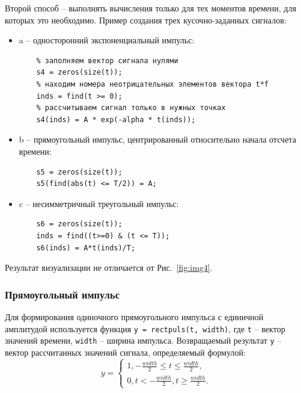 \documentclass[12pt,a4paper]{article}
\begin{document}
Второй способ -- выполнять вычисления только для тех моментов времени, для которых это необходимо. Пример создания  трех кусочно-заданных сигналов:
\begin{itemize}
  \item a -- односторонний экспоненциальный импульс:
    \begin{verbatim}
    % заполняем вектор сигнала нулями
    s4 = zeros(size(t));
    % находим номера неотрицательных элементов вектора t*f
    inds = find(t >= 0);
    % рассчитываем сигнал только в нужных точках
    s4(inds) = A * exp(-alpha * t(inds));
    \end{verbatim}
      \item b -- прямоугольный импульс, центрированный относительно начала отсчета времени:
    \begin{verbatim}
    s5 = zeros(size(t));
    s5(find(abs(t) <= T/2)) = A;
    \end{verbatim}
      \item c -- несимметричный треугольный импульс:
    \begin{verbatim}
    s6 = zeros(size(t));
    inds = find((t>=0) & (t <= T));
    s6(inds) = A*t(inds)/T;
    \end{verbatim}
\end{itemize}
Результат визуализации не отличается от Рис.~\ref{fig:img4}.


\subsubsection{Прямоугольный импульс}
Для формирования одиночного прямоугольного импульса с единичной амплитудой используется функция
\verb|y = rectpuls(t, width)|, где \verb|t| -- вектор значений времени, \verb|width| --  ширина импульса.
Возвращаемый результат \verb|y| -- вектор рассчитанных значений сигнала, определяемый формулой:
\begin{equation}
  y=
  \begin{cases}
    1, -\frac{width}{2} \leq t \leq \frac{width}{2}, \\
    0, t < -\frac{width}{2}, t \geq \frac{width}{2}.
  \end{cases}
\end{equation}
\end{document}

